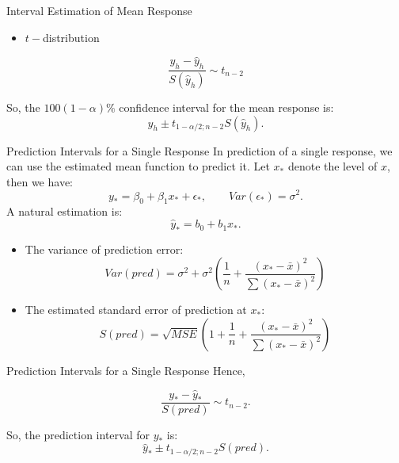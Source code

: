 \documentclass[
  ignorenonframetext,
]{beamer}
\providecommand{\tightlist}{%
  \setlength{\itemsep}{0pt}\setlength{\parskip}{0pt}}
\begin{document}
\begin{frame}{Interval Estimation of Mean Response}
\protect\hypertarget{interval-estimation-of-mean-response-1}{}
\begin{itemize}
\tightlist
\item
  \(t-\)distribution
\end{itemize}

\[\frac{y_h-\hat{y}_h}{S(\hat{y}_h)}\sim t_{n-2}\]

So, the \(100(1-\alpha)\%\) confidence interval for the mean response
is: \[\hat{y}_h\pm t_{1 -\alpha/2; n-2}S(\hat{y}_h).\]
\end{frame}

\begin{frame}{Prediction Intervals for a Single Response}
\protect\hypertarget{prediction-intervals-for-a-single-response}{}
In prediction of a single response, we can use the estimated mean
function to predict it. Let \(x_*\) denote the level of \(x\), then we
have:
\[ y_*=\beta_0+\beta_1x_*+\epsilon_*, \quad \quad Var(\epsilon_*)=\sigma^2.\]
A natural estimation is: \[ \hat{y}_*=b_0+b_1x_*.\]

\begin{itemize}
\tightlist
\item
  The variance of prediction error:
  \[ Var(pred)=\sigma^2+\sigma^2\left(\frac{1}{n}+\frac{(x_* -\bar{x})^2}{\sum (x_* -\bar{x})^2}\right)\]
\item
  The estimated standard error of prediction at \(x_*\):
  \[S(pred)=\sqrt{MSE}\left(1+\frac{1}{n}+\frac{(x_* -\bar{x})^2}{\sum (x_* -\bar{x})^2}\right)\]
\end{itemize}
\end{frame}

\begin{frame}{Prediction Intervals for a Single Response}
\protect\hypertarget{prediction-intervals-for-a-single-response-1}{}
Hence,

\[\frac{y_*-\hat{y}_*}{S(pred)}\sim t_{n-2}.\]

So, the prediction interval for \(y_*\) is:
\[\hat{y}_*\pm t_{1 - \alpha/2; n-2}S(pred).\]
\end{frame}
\end{document}
